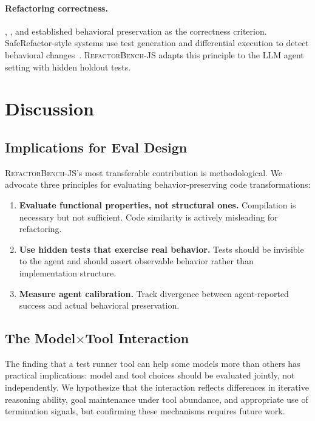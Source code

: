 \documentclass[11pt,letterpaper]{article}
\begin{document}
\paragraph{Refactoring correctness.} \citet{opdyke1992refactoring}, \citet{griswold1993automated}, and \citet{fowler1999refactoring} established behavioral preservation as the correctness criterion. SafeRefactor-style systems use test generation and differential execution to detect behavioral changes~\citep{soares2013automated}. \textsc{RefactorBench}-JS adapts this principle to the LLM agent setting with hidden holdout tests.

\section{Discussion}

\subsection{Implications for Eval Design}

\textsc{RefactorBench}-JS's most transferable contribution is methodological. We advocate three principles for evaluating behavior-preserving code transformations:

\begin{enumerate}[leftmargin=2em]
\item \textbf{Evaluate functional properties, not structural ones.} Compilation is necessary but not sufficient. Code similarity is actively misleading for refactoring.
\item \textbf{Use hidden tests that exercise real behavior.} Tests should be invisible to the agent and should assert observable behavior rather than implementation structure.
\item \textbf{Measure agent calibration.} Track divergence between agent-reported success and actual behavioral preservation.
\end{enumerate}

\subsection{\texorpdfstring{The Model$\times$Tool Interaction}{The Model x Tool Interaction}}

The finding that a test runner tool can help some models more than others has practical implications: model and tool choices should be evaluated jointly, not independently. We hypothesize that the interaction reflects differences in iterative reasoning ability, goal maintenance under tool abundance, and appropriate use of termination signals, but confirming these mechanisms requires future work.
\end{document}
